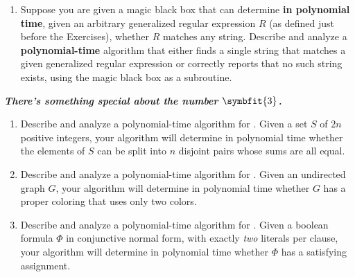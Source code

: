 \begin{exercises}
\begin{enumerate}
Describe and analyze a \textbf{polynomial-time} algorithm that either computes an equal partition of a given set of positive integers or correctly reports that no such partition exists, using the magic black box as a subroutine.
\item {} Suppose you are given a magic black box that can determine \textbf{in polynomial time}, given an arbitrary generalized regular expression $R$ (as defined just before the Exercises), whether $R$ matches any string.
Describe and analyze a \textbf{polynomial-time} algorithm that either finds a single string that matches a given generalized regular expression or correctly reports that no such string exists, using the magic black box as a subroutine.
\end{enumerate}

\item \textbf{\textit{There’s something special about the number $\symbfit{3}$.}}
\begin{enumerate}
\item Describe and analyze a polynomial-time algorithm for .
Given a set $S$ of $2n$ positive integers, your algorithm will determine in polynomial time whether the elements of $S$ can be split into $n$ disjoint pairs whose sums are all equal.
\item Describe and analyze a polynomial-time algorithm for .
Given an undirected graph $G$, your algorithm will determine in polynomial time whether $G$ has a proper coloring that uses only two colors.
\item Describe and analyze a polynomial-time algorithm for .
Given a boolean formula $\Phi$ in conjunctive normal form, with exactly \textit{two} literals per clause, your algorithm will determine in polynomial time whether $\Phi$ has a satisfying assignment.
\end{enumerate}


\end{exercises}
